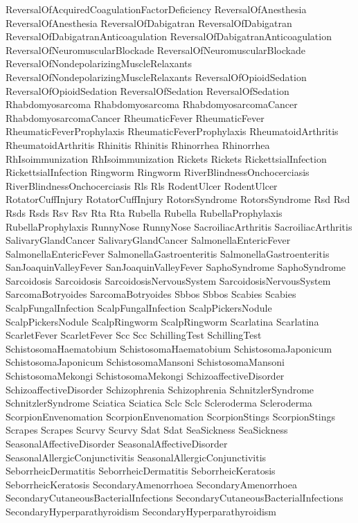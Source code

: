  ReversalOfAcquiredCoagulationFactorDeficiency
 ReversalOfAnesthesia
 ReversalOfAnesthesia
 ReversalOfDabigatran
 ReversalOfDabigatran
 ReversalOfDabigatranAnticoagulation
 ReversalOfDabigatranAnticoagulation
 ReversalOfNeuromuscularBlockade
 ReversalOfNeuromuscularBlockade
 ReversalOfNondepolarizingMuscleRelaxants
 ReversalOfNondepolarizingMuscleRelaxants
 ReversalOfOpioidSedation
 ReversalOfOpioidSedation
 ReversalOfSedation
 ReversalOfSedation
 Rhabdomyosarcoma
 Rhabdomyosarcoma
 RhabdomyosarcomaCancer
 RhabdomyosarcomaCancer
 RheumaticFever
 RheumaticFever
 RheumaticFeverProphylaxis
 RheumaticFeverProphylaxis
 RheumatoidArthritis
 RheumatoidArthritis
 Rhinitis
 Rhinitis
 Rhinorrhea
 Rhinorrhea
 RhIsoimmunization
 RhIsoimmunization
 Rickets
 Rickets
 RickettsialInfection
 RickettsialInfection
 Ringworm
 Ringworm
 RiverBlindnessOnchocerciasis
 RiverBlindnessOnchocerciasis
 Rls
 Rls
 RodentUlcer
 RodentUlcer
 RotatorCuffInjury
 RotatorCuffInjury
 RotorsSyndrome
 RotorsSyndrome
 Rsd
 Rsd
 Rsds
 Rsds
 Rsv
 Rsv
 Rta
 Rta
 Rubella
 Rubella
 RubellaProphylaxis
 RubellaProphylaxis
 RunnyNose
 RunnyNose
 SacroiliacArthritis
 SacroiliacArthritis
 SalivaryGlandCancer
 SalivaryGlandCancer
 SalmonellaEntericFever
 SalmonellaEntericFever
 SalmonellaGastroenteritis
 SalmonellaGastroenteritis
 SanJoaquinValleyFever
 SanJoaquinValleyFever
 SaphoSyndrome
 SaphoSyndrome
 Sarcoidosis
 Sarcoidosis
 SarcoidosisNervousSystem
 SarcoidosisNervousSystem
 SarcomaBotryoides
 SarcomaBotryoides
 Sbbos
 Sbbos
 Scabies
 Scabies
 ScalpFungalInfection
 ScalpFungalInfection
 ScalpPickersNodule
 ScalpPickersNodule
 ScalpRingworm
 ScalpRingworm
 Scarlatina
 Scarlatina
 ScarletFever
 ScarletFever
 Scc
 Scc
 SchillingTest
 SchillingTest
 SchistosomaHaematobium
 SchistosomaHaematobium
 SchistosomaJaponicum
 SchistosomaJaponicum
 SchistosomaMansoni
 SchistosomaMansoni
 SchistosomaMekongi
 SchistosomaMekongi
 SchizoaffectiveDisorder
 SchizoaffectiveDisorder
 Schizophrenia
 Schizophrenia
 SchnitzlerSyndrome
 SchnitzlerSyndrome
 Sciatica
 Sciatica
 Sclc
 Sclc
 Scleroderma
 Scleroderma
 ScorpionEnvenomation
 ScorpionEnvenomation
 ScorpionStings
 ScorpionStings
 Scrapes
 Scrapes
 Scurvy
 Scurvy
 Sdat
 Sdat
 SeaSickness
 SeaSickness
 SeasonalAffectiveDisorder
 SeasonalAffectiveDisorder
 SeasonalAllergicConjunctivitis
 SeasonalAllergicConjunctivitis
 SeborrheicDermatitis
 SeborrheicDermatitis
 SeborrheicKeratosis
 SeborrheicKeratosis
 SecondaryAmenorrhoea
 SecondaryAmenorrhoea
 SecondaryCutaneousBacterialInfections
 SecondaryCutaneousBacterialInfections
 SecondaryHyperparathyroidism
 SecondaryHyperparathyroidism
